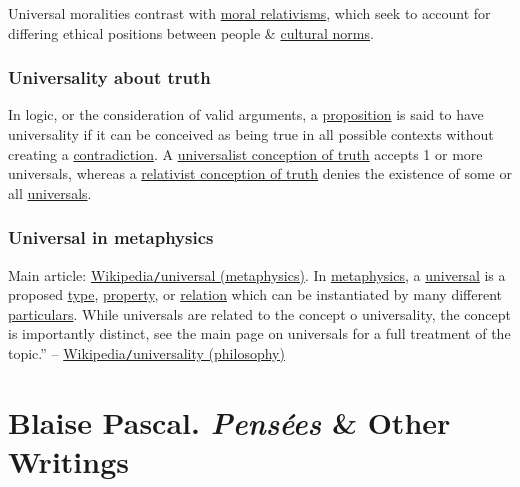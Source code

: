 \documentclass{article}
\begin{document}
Universal moralities contrast with \href{https://en.wikipedia.org/wiki/Moral_relativism}{moral relativisms}, which seek to account for differing ethical positions between people \& \href{https://en.wikipedia.org/wiki/Social_norm}{cultural norms}.

\subsubsection{Universality about truth}
In logic, or the consideration of valid arguments, a \href{https://en.wikipedia.org/wiki/Proposition}{proposition} is said to have universality if it can be conceived as being true in all possible contexts without creating a \href{https://en.wikipedia.org/wiki/Contradiction}{contradiction}. A \href{https://en.wikipedia.org/wiki/Universalism}{universalist conception of truth} accepts 1 or more universals, whereas a \href{https://en.wikipedia.org/wiki/Relativism}{relativist conception of truth} denies the existence of some or all \href{https://en.wikipedia.org/wiki/Problem_of_universals}{universals}.

\subsubsection{Universal in metaphysics}
Main article: \href{https://en.wikipedia.org/wiki/Universal_(metaphysics)}{Wikipedia{\tt/}universal (metaphysics)}. In \href{https://en.wikipedia.org/wiki/Metaphysics}{metaphysics}, a \href{https://en.wikipedia.org/wiki/Universal_(metaphysics)}{universal} is a proposed \href{https://en.wikipedia.org/wiki/Type_(metaphysics)}{type}, \href{https://en.wikipedia.org/wiki/Property_(metaphysics)}{property}, or \href{https://en.wikipedia.org/wiki/Relation_(metaphysics)}{relation} which can be instantiated by many different \href{https://en.wikipedia.org/wiki/Particular}{particulars}. While universals are related to the concept o universality, the concept is importantly distinct, see the main page on universals for a full treatment of the topic.'' -- \href{https://en.wikipedia.org/wiki/Universality_(philosophy)}{Wikipedia{\tt/}universality (philosophy)}


\section{{\sc Blaise Pascal}. {\it Pens\'ees} \& Other Writings}
\end{document}
